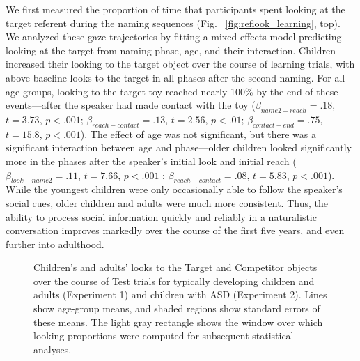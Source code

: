 \documentclass{pnastwo}
\begin{document}
\begin{article}
We first measured the proportion of time that participants spent looking at the target referent during the naming sequences (Fig. ~\ref{fig:reflook_learning}, top). We analyzed these gaze trajectories by fitting a mixed-effects model predicting looking at the target from naming phase, age, and their interaction. Children increased their looking to the target object over the course of learning trials, with above-baseline looks to the target in all phases after the second naming. For all age groups, looking to the target toy reached nearly 100\% by the end of these events---after the speaker had made contact with the toy ($\beta_{name2-reach} = .18$, $t = 3.73$, $p < .001$; $\beta_{reach-contact} = .13$, $t = 2.56$, $p < .01$; $\beta_{contact-end} = .75$, $t = 15.8$, $p < .001$). The effect of age was not significant, but there was a significant interaction between age and phase---older children looked significantly more in the phases after the speaker's initial look and initial reach ($\beta_{look-name2} = .11$, $t = 7.66$, $p < .001$ ; $\beta_{reach-contact} = .08$, $t = 5.83$, $p < .001$). While the youngest children were only occasionally able to follow the speaker's social cues, older children and adults were much more consistent. Thus, the ability to process social information quickly and reliably in a naturalistic conversation improves markedly over the course of the first five years, and even further into adulthood.

\begin{figure}[tb]
	\caption{\label{fig:reflook_timecourse}Children's and adults' looks to the Target and Competitor objects over the course of Test trials for typically developing children and adults (Experiment 1) and children with ASD (Experiment 2). Lines show age-group means, and shaded regions show standard errors of these means. The light gray rectangle shows the window over which looking proportions were computed for subsequent statistical analyses.}
\end{figure}


\end{article}
\end{document}

